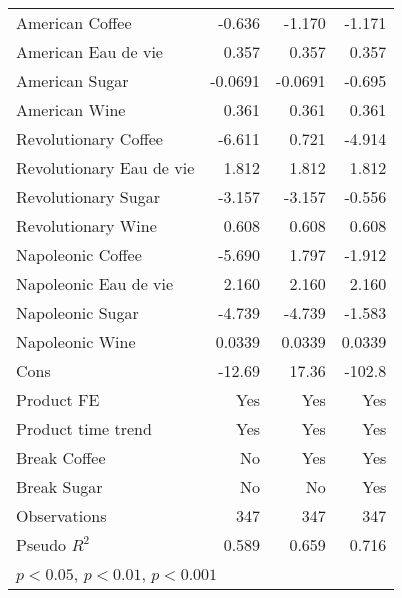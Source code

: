 \begin{table}[htbp]
\begin{tabular}{l*{3}{D{.}{.}{-1}}}
American Coffee     &      -0.636         &      -1.170\sym{***}&      -1.171\sym{***}\\
American Eau de vie &       0.357         &       0.357         &       0.357         \\
American Sugar      &     -0.0691         &     -0.0691         &      -0.695\sym{*}  \\
American Wine       &       0.361\sym{**} &       0.361\sym{**} &       0.361\sym{**} \\
Revolutionary Coffee&      -6.611\sym{***}&       0.721         &      -4.914         \\
Revolutionary Eau de vie&       1.812\sym{***}&       1.812\sym{***}&       1.812\sym{***}\\
Revolutionary Sugar &      -3.157\sym{***}&      -3.157\sym{***}&      -0.556         \\
Revolutionary Wine  &       0.608\sym{***}&       0.608\sym{***}&       0.608\sym{***}\\
Napoleonic Coffee   &      -5.690\sym{***}&       1.797         &      -1.912         \\
Napoleonic Eau de vie&       2.160\sym{***}&       2.160\sym{***}&       2.160\sym{***}\\
Napoleonic Sugar    &      -4.739\sym{***}&      -4.739\sym{***}&      -1.583         \\
Napoleonic Wine     &      0.0339         &      0.0339         &      0.0339         \\
Cons                &      -12.69         &       17.36         &      -102.8\sym{***}\\
Product FE          &         Yes         &         Yes         &         Yes         \\
Product time trend  &         Yes         &         Yes         &         Yes         \\
Break Coffee        &          No         &         Yes         &         Yes         \\
Break Sugar         &          No         &          No         &         Yes         \\
\hline
Observations        &         347         &         347         &         347         \\
Pseudo \(R^{2}\)    &       0.589         &       0.659         &       0.716         \\
\hline\hline
{}\\
\end{tabular}
\end{table}
